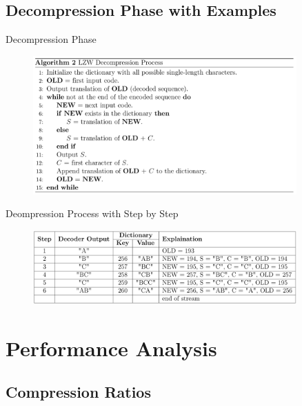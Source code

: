 \documentclass[10pt,handout,english]{beamer}
\begin{document}
\subsection{Decompression Phase with Examples}
\begin{frame}{Decompression Phase}
    \begin{figure}
        \centering
        \includegraphics[width=0.9\textwidth]{pic/pseudo_decompress.png}
    \end{figure}
\end{frame}

\begin{frame}{Deompression Process with Step by Step}
    \begin{figure}
        \centering
        \includegraphics[width=0.9\textwidth]{pic/example_decompress.png}
    \end{figure}
\end{frame}

\newpage

\section{Performance Analysis}
\subsection{Compression Ratios}
\end{document}
